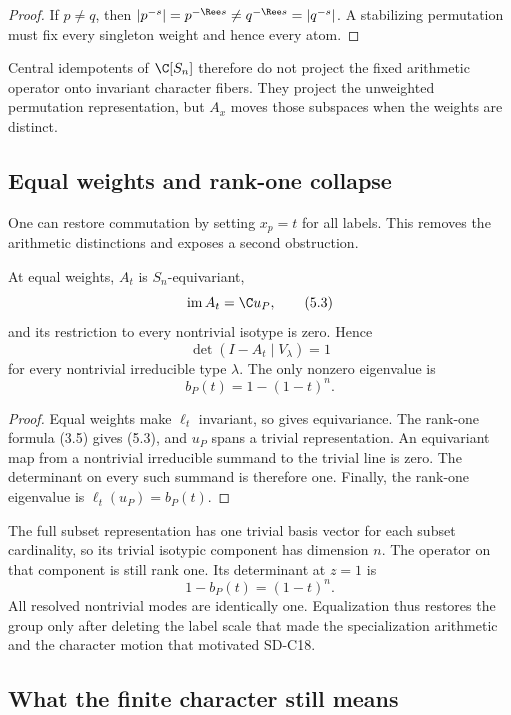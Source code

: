 \begin{proof}
If $p\ne q$, then
$|p^{-s}|=p^{-\Ree s}\ne q^{-\Ree s}=|q^{-s}|$.  A stabilizing permutation
must fix every singleton weight and hence every atom.
\end{proof}

Central idempotents of $\C[S_n]$ therefore do not project the fixed arithmetic
operator onto invariant character fibers.  They project the unweighted
permutation representation, but $A_x$ moves those subspaces when the weights
are distinct.

\subsection{Equal weights and rank-one collapse}

One can restore commutation by setting $x_p=t$ for all labels.  This removes
the arithmetic distinctions and exposes a second obstruction.

\begin{theorem}
\label{thm:equal-weight}
At equal weights, $A_t$ is $S_n$-equivariant,
\[
  \operatorname{im}A_t=\C u_P,
  \tag{5.3}
\]
and its restriction to every nontrivial isotype is zero.  Hence
\[
  \det(I-A_t\mid V_\lambda)=1
  \tag{5.4}
\]
for every nontrivial irreducible type $\lambda$.  The only nonzero eigenvalue
is
\[
  b_P(t)=1-(1-t)^n.
  \tag{5.5}
\]
\end{theorem}

\begin{proof}
Equal weights make $\ell_t$ invariant, so  gives
equivariance.  The rank-one formula (3.5) gives (5.3), and $u_P$ spans a
trivial representation.  An equivariant map from a nontrivial irreducible
summand to the trivial line is zero.  The determinant on every such summand
is therefore one.  Finally, the rank-one eigenvalue is
$\ell_t(u_P)=b_P(t)$.
\end{proof}

The full subset representation has one trivial basis vector for each subset
cardinality, so its trivial isotypic component has dimension $n$.  The
operator on that component is still rank one.  Its determinant at $z=1$ is
\[
  1-b_P(t)=(1-t)^n.
  \tag{5.6}
\]
All resolved nontrivial modes are identically one.  Equalization thus restores
the group only after deleting the label scale that made the specialization
arithmetic and the character motion that motivated SD-C18.

\subsection{What the finite character still means}


